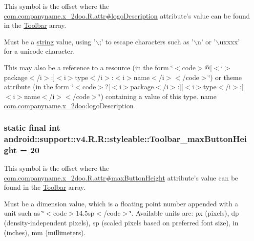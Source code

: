 This symbol is the offset where the \hyperlink{classcom_1_1companyname_1_1x__2doo_1_1_r_1_1attr_c43d9451d5f166982cc12c2114392652}{com.companyname.x\_\-2doo.R.attr\#logoDescription} attribute's value can be found in the \hyperlink{classandroid_1_1support_1_1v4_1_1_r_1_1styleable_0646d71cfbd4a8645c7d805b33e1c574}{Toolbar} array.

Must be a \hyperlink{classandroid_1_1support_1_1v4_1_1_r_1_1string}{string} value, using '$\backslash$;' to escape characters such as '$\backslash$n' or '$\backslash$uxxxx' for a unicode character. 

This may also be a reference to a resource (in the form \char`\"{}$<$code$>$@\mbox{[}$<$i$>$package$<$/i$>$:\mbox{]}$<$i$>$type$<$/i$>$:$<$i$>$name$<$/i$>$$<$/code$>$\char`\"{}) or theme attribute (in the form \char`\"{}$<$code$>$?\mbox{[}$<$i$>$package$<$/i$>$:\mbox{]}\mbox{[}$<$i$>$type$<$/i$>$:\mbox{]}$<$i$>$name$<$/i$>$$<$/code$>$\char`\"{}) containing a value of this type.  name \hyperlink{namespacecom_1_1companyname_1_1x__2doo}{com.companyname.x\_\-2doo}:logoDescription \hypertarget{classandroid_1_1support_1_1v4_1_1_r_1_1styleable_ab5a559be253c4d3f91654f99866d524}{
\subsubsection[{Toolbar\_\-maxButtonHeight}]{\setlength{\rightskip}{0pt plus 5cm}static final int android::support::v4.R.R::styleable::Toolbar\_\-maxButtonHeight = 20}}
\label{classandroid_1_1support_1_1v4_1_1_r_1_1styleable_ab5a559be253c4d3f91654f99866d524}


This symbol is the offset where the \hyperlink{classcom_1_1companyname_1_1x__2doo_1_1_r_1_1attr_f7e11d9d372c8a717661b86e807b8783}{com.companyname.x\_\-2doo.R.attr\#maxButtonHeight} attribute's value can be found in the \hyperlink{classandroid_1_1support_1_1v4_1_1_r_1_1styleable_0646d71cfbd4a8645c7d805b33e1c574}{Toolbar} array.

Must be a dimension value, which is a floating point number appended with a unit such as \char`\"{}$<$code$>$14.5sp$<$/code$>$\char`\"{}. Available units are: px (pixels), dp (density-independent pixels), sp (scaled pixels based on preferred font size), in (inches), mm (millimeters). 

